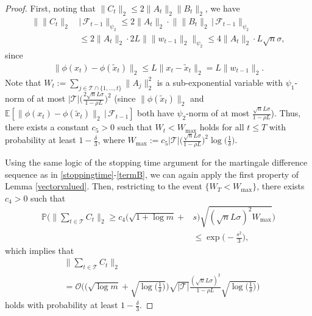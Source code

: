 \documentclass[letterpaper,10pt,conference]{ieeeconf}
\theoremstyle{plain} %
\theoremstyle{plain} %
\theoremstyle{plain} %
\theoremstyle{plain}
\begin{document}
\begin{proof}
  
 First, noting that $\|C_t\|_2 \le 2\|A_t\|_2 \|B_t\|_2$, we have 
  \begin{align*}
      \bigr\|  \|C_t\|_2 \,&\bigr|\,\mathcal{F}_{t-1} \bigr\|_{\psi_2}\le 2\|A_t\|_2 \cdot \bigr\| \|B_t\|_2 \,\bigr|\,\mathcal{F}_{t-1} \bigr\|_{\psi_2}\\&\le 2\|A_t\|_2 \cdot 2L\bigr\|\|w_{t-1}\|_2\bigr\|_{\psi_2}\le 4\|A_t\|_2 \cdot L\sqrt{n}\sigma,
  \end{align*}
  since \begin{align}\label{xttildext}
      \|\phi(x_t)-\phi(\tilde x_t)\|_2 \le L\|x_t-\tilde x_t\|_2 =  L\|w_{t-1}\|_2.
  \end{align} 
  Note that $W_t:= \sum_{j\in\mathcal{T}\cap \{1,\dots, t\}} \|A_j\|_2^2$ is a sub-exponential variable with $\psi_1$-norm of at most $|\mathcal{T}|\bigr(\frac{2\sqrt{n}L\sigma}{1-\rho L}\bigr)^2$ (since $\|\phi(\tilde x_t)\|_2$ and $\mathbb{E}[\|\phi(x_t) - \phi(\tilde x_t)\|_2\,|\,\mathcal{F}_{t-1}]$ both have $\psi_2$-norm of at most $\frac{\sqrt{n}L\sigma}{1-\rho L}$). Thus, there exists a constant $c_5>0$ such that $W_t <W_{\text{max}}$ holds for all $t\le T$ with probability at least $1-\frac{\delta}{3}$, where $W_\text{max} := c_5 |\mathcal{T}|\bigr(\frac{\sqrt{n}L\sigma}{1-\rho L}\bigr)^2\log\big(\frac{1}{\delta}\big)$. 


Using the same logic of the stopping time argument for the martingale difference sequence as in \eqref{stoppingtime}-\eqref{termB}, we can again  apply the first property of Lemma \ref{vectorvalued}. Then, restricting to the event $\{W_T<W_\text{max}\}$, there exists $c_4>0$ such that 
  \begin{align}\label{ct}
     \nonumber \mathbb{P}\biggr(\Bigr\|\sum_{t\in\mathcal{T}} C_t\Bigr\|_2 \ge c_4(\sqrt{1+\log m}+&s)\sqrt{ (\sqrt{n}L\sigma)^2 W_\text{max}}\biggr)\\&\le \exp\Bigr(-\frac{s^2}{3}\Bigr),
  \end{align}
which implies that 
  \begin{align}\label{sumct}
 \nonumber  &   \Bigr\| \sum_{t\in\mathcal{T}} C_t\Bigr\|_2 \\&=\mathcal{O}\biggr( \Bigr( \sqrt{\log m}+ \sqrt{\log\Bigr( \frac{1}{\delta}\Bigr)} \Bigr) \sqrt{|\mathcal{T}|}\frac{ (\sqrt{n}L \sigma)^2}{1-\rho L}\sqrt{\log\Bigr( \frac{1}{\delta}\Bigr)}\biggr)
  \end{align}
holds   with probability at least $1-\frac{\delta}{3}$.


\end{proof}
\end{document}
